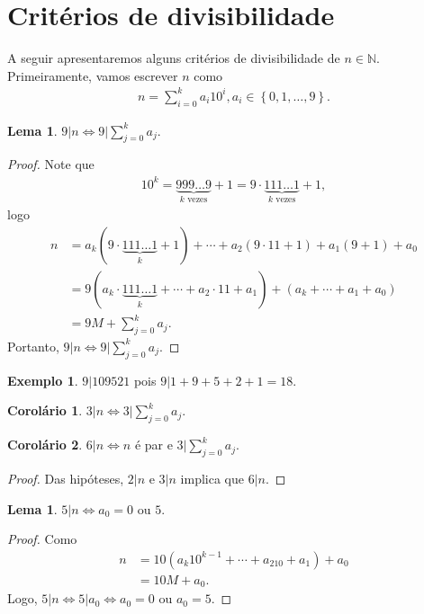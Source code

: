 \documentclass[a4paper,11pt,twoside, leqno]{article}
\theoremstyle{definition}
\newtheorem{corollary}{Corolário}[theorem]
\newtheorem{lemma}[theorem]{Lema}
\newtheorem*{example}{Exemplo}
\begin{document}
\section{Critérios de divisibilidade}
\hspace{12pt} A seguir apresentaremos alguns critérios de divisibilidade de $n\in\mathbb{N}$. Primeiramente, vamos escrever $n$ como
\begin{align*}
n = \sum_{i=0}^{k}a_i10^i, a_i\in\left\{ 0,1,\dots,9 \right\}.
\end{align*}
\begin{lemma}
	$9|n \Leftrightarrow 9\Big| \displaystyle{ \sum_{j=0}^{k}a_j }$.
\end{lemma}
\begin{proof}
	Note que
	\begin{align*}
	10^k = \underbrace{999\dots 9}_{k \text{ vezes}} + 1 = 9\cdot \underbrace{111\dots 1}_{k \text{ vezes}} + 1,
	\end{align*}
	logo 
	\begin{align*}
	n &= a_k(9\cdot \underbrace{111\dots 1}_{k} + 1) + \cdots + a_2(9\cdot 11 + 1) + a_1(9+1) + a_0 \\
	&= 9(a_k\cdot\underbrace{111\dots 1}_{k} + \cdots + a_2\cdot 11 + a_1) + (a_k + \cdots + a_1 + a_0 ) \\
	&= 9M + \sum_{j=0}^{k}a_j.
	\end{align*}
	Portanto, $9|n\Leftrightarrow 9\Big| \displaystyle{ \sum_{j=0}^{k}a_j }$.
\end{proof}
\begin{example}
	$9|109521$ pois $9|1+9+5+2+1=18$.
\end{example}
\begin{corollary}
	$3|n \Leftrightarrow 3\Big| \displaystyle{ \sum_{j=0}^{k}a_j }$.
\end{corollary}
\begin{corollary}
	$6|n \Leftrightarrow n$ é par e $ 3\Big| \displaystyle{ \sum_{j=0}^{k}a_j }$.
\end{corollary}
\begin{proof}
	Das hipóteses, $2|n$ e $3|n$ implica que $6|n$.
\end{proof}
\begin{lemma}
	$5|n \Leftrightarrow a_0 = 0$ ou $5$.
\end{lemma}
\begin{proof}
	Como 
	\begin{align*}
	n &= 10(a_k10^{k-1} + \cdots + a_210 + a_1) + a_0 \\
	&= 10M + a_0.
	\end{align*}
	Logo, $5|n \Leftrightarrow 5|a_0 \Leftrightarrow a_0 = 0$ ou $a_0 = 5$.
\end{proof}
\end{document}
